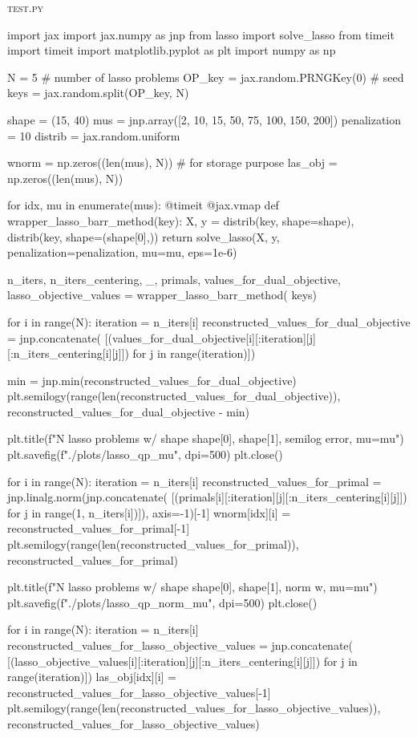 \documentclass{article}
\begin{document}
\textsc{test.py}
\begin{python}
import jax
import jax.numpy as jnp
from lasso import solve_lasso
from timeit import timeit
import matplotlib.pyplot as plt
import numpy as np

N = 5  # number of lasso problems
OP_key = jax.random.PRNGKey(0)  # seed
keys = jax.random.split(OP_key, N)

shape = (15, 40)
mus = jnp.array([2, 10, 15, 50, 75, 100, 150, 200])
penalization = 10
distrib = jax.random.uniform

wnorm = np.zeros((len(mus), N))  # for storage purpose
las_obj = np.zeros((len(mus), N))

for idx, mu in enumerate(mus):
    @timeit
    @jax.vmap
    def wrapper_lasso_barr_method(key):
        X, y = distrib(key, shape=shape), distrib(key, shape=(shape[0],))
        return solve_lasso(X, y, penalization=penalization, mu=mu, eps=1e-6)


    n_iters, n_iters_centering, _, primals, values_for_dual_objective, lasso_objective_values = wrapper_lasso_barr_method(
        keys)

    for i in range(N):
        iteration = n_iters[i]
        reconstructed_values_for_dual_objective = jnp.concatenate(
            [(values_for_dual_objective[i][:iteration][j][:n_iters_centering[i][j]]) for j in
             range(iteration)])

        min = jnp.min(reconstructed_values_for_dual_objective)
        plt.semilogy(range(len(reconstructed_values_for_dual_objective)), reconstructed_values_for_dual_objective - min)

    plt.title(f"{N} lasso problems w/ shape {shape[0], shape[1]}, semilog error, mu={mu}")
    plt.savefig(f"./plots/lasso_qp_{mu}", dpi=500)
    plt.close()

    for i in range(N):
        iteration = n_iters[i]
        reconstructed_values_for_primal = jnp.linalg.norm(jnp.concatenate(
            [(primals[i][:iteration][j][:n_iters_centering[i][j]]) for j in
             range(1, n_iters[i])]),
            axis=-1)[-1]
        wnorm[idx][i] = reconstructed_values_for_primal[-1]
        plt.semilogy(range(len(reconstructed_values_for_primal)), reconstructed_values_for_primal)

    plt.title(f"{N} lasso problems w/ shape {shape[0], shape[1]}, norm w, mu={mu}")
    plt.savefig(f"./plots/lasso_qp_norm_{mu}", dpi=500)
    plt.close()

    for i in range(N):
        iteration = n_iters[i]
        reconstructed_values_for_lasso_objective_values = jnp.concatenate(
            [(lasso_objective_values[i][:iteration][j][:n_iters_centering[i][j]]) for j in
             range(iteration)])
        las_obj[idx][i] = reconstructed_values_for_lasso_objective_values[-1]
        plt.semilogy(range(len(reconstructed_values_for_lasso_objective_values)),
                     reconstructed_values_for_lasso_objective_values)


\end{python}
\end{document}
